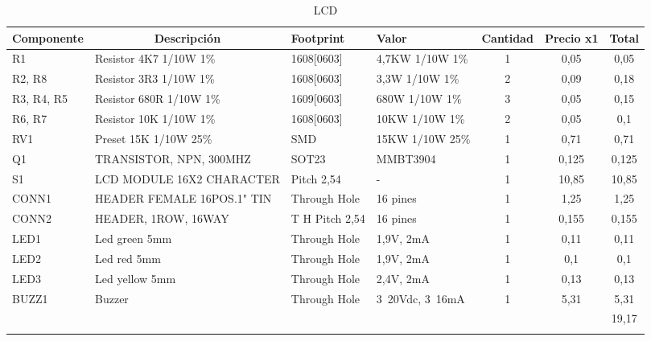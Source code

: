 \begin{longtable}{|l|p{3cm}|p{2cm}|p{2cm}|c|c|c|}
\hline
\multicolumn{1}{|c|}{\textbf{Componente}} & \multicolumn{1}{c|}{\textbf{Descripción}} & \textbf{ Footprint} & \textbf{Valor} & \textbf{Cantidad} & \textbf{Precio x1} & \textbf{Total} \\ \hline
R1 & Resistor 4K7    1/10W     1\% & 1608[0603] & 4,7KW  1/10W   1\% & 1 & 0,05 & 0,05 \\ \hline
R2, R8 & Resistor 3R3    1/10W     1\% & 1608[0603] & 3,3W    1/10W   1\% & 2 & 0,09 & 0,18 \\ \hline
R3, R4, R5 & Resistor 680R  1/10W     1\% & 1609[0603] & 680W   1/10W   1\% & 3 & 0,05 & 0,15 \\ \hline
R6, R7 & Resistor 10K    1/10W     1\% & 1608[0603] & 10KW  1/10W   1\% & 2 & 0,05 & 0,1 \\ \hline
RV1 & Preset 15K        1/10W  25\% & SMD & 15KW   1/10W  25\% & 1 & 0,71 & 0,71 \\ \hline
Q1 & TRANSISTOR, NPN, 300MHZ & SOT23 & MMBT3904 & 1 & 0,125 & 0,125 \\ \hline
S1 & LCD MODULE 16X2 CHARACTER & Pitch 2,54 & - & 1 & 10,85 & 10,85 \\ \hline
CONN1 & HEADER FEMALE 16POS.1" TIN & Through Hole & 16 pines & 1 & 1,25 & 1,25 \\ \hline
CONN2 & HEADER, 1ROW, 16WAY & T H Pitch 2,54 & 16 pines & 1 & 0,155 & 0,155 \\ \hline
LED1 & Led green 5mm & Through Hole & 1,9V,  2mA & 1 & 0,11 & 0,11 \\ \hline
LED2 & Led red 5mm & Through Hole & 1,9V,  2mA & 1 & 0,1 & 0,1 \\ \hline
LED3 & Led yellow 5mm & Through Hole & 2,4V,  2mA & 1 & 0,13 & 0,13 \\ \hline
BUZZ1 & Buzzer & Through Hole & 3~20Vdc, 3~16mA & 1 & 5,31 & 5,31 \\ \hline
 &  & \multicolumn{1}{l|}{} & \multicolumn{1}{l|}{} & \multicolumn{1}{l|}{} & \multicolumn{1}{l|}{} & 19,17 \\ \hline
\caption{LCD}
\label{}
\end{longtable}


